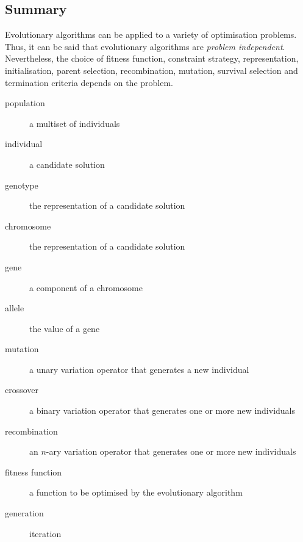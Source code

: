 \subsection{Summary}

Evolutionary algorithms can be applied to a variety of optimisation problems.
Thus, it can be said that evolutionary algorithms are \emph{problem independent}.
Nevertheless, the choice of fitness function, constraint strategy, representation, initialisation, parent selection, recombination, mutation, survival selection and termination criteria depends on the problem.

\begin{description}
  \item[population] a multiset of individuals
  \item[individual] a candidate solution
  \item[genotype] the representation of a candidate solution
  \item[chromosome] the representation of a candidate solution
  \item[gene] a component of a chromosome
  \item[allele] the value of a gene
  \item[mutation] a unary variation operator that generates a new individual
  \item[crossover] a binary variation operator that generates one or more new individuals
  \item[recombination] an \( n \)-ary variation operator that generates one or more new individuals
  \item[fitness function] a function to be optimised by the evolutionary algorithm
  \item[generation] iteration
\end{description}
